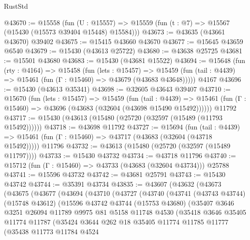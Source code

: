\begin{lexlean}{RustStd}
\begin{coremodule}
@43670 := @15558
    (fun (U : @15557) => @15559 (fun (t : @7) => @15567 (@15430 (@15573 @39404 @15448) @15584)))
@43673 := @43635 (@43661 @43670) @39402
@43675 := @15415 @43660 @43670
@43677 := @15645 @43659 @6540
@43679 := @15430 (@43613 @25722)
@43680 := @43638 @25725
@43681 := @15501 @43680
@43683 := @15430 (@43681 @15522)
@43694 := @15648
    (fun (rty : @4164) =>
    @15458
      (fun (lets : @15457) =>
      @15459 (fun (tail : @4439) => @15461 (fun (Γ : @15460) => @43679 (@43683 @43648)))))
    @4167
@43696 := @15430 (@43613 @35341)
@43698 := @32605 @43643 @39407
@43710 := @15670
    (fun (lets : @15457) =>
    @15459
      (fun (tail : @4439) =>
      @15461 (fun (Γ : @15460) => @43696 (@43683 (@32604 (@43698 @15490 @15492))))))
    @11792
@43717 := @15430 (@43613 (@15480 (@25720 (@32597 (@15489 (@11793 @15492))))))
@43718 := @43698 @11792
@43727 := @15694
    (fun (tail : @4439) => @15461 (fun (Γ : @15460) => @43717 (@43683 (@32604 (@43718 @15492)))))
    @11796
@43732 := @43613 (@15480 (@25720 (@32597 (@15489 @11797))))
@43733 := @15430 @43732
@43734 := @43718 @11796
@43740 := @15712 (fun (Γ : @15460) => @43733 (@43683 (@32604 @43734))) @25788
@43741 := @15596 @43732
@43742 := @43681 @25791
@43743 := @15430 @43742
@43744 := @35391 @43734
@43835 := @43607
    (@43632
      (@43673
        (@43675
          (@43677
            (@43694
              (@43710
                (@43727
                  (@43740
                    (@43741
                      (@43743 @43744)
                      (@15748 @43612)
                      (@15596
                        @43742
                        @43744
                        (@15753 @43680)
                        (@35407
                          @3646
                          @3251
                          @26094
                          @11789
                          @9975
                          @81
                          @5158
                          @11748
                          @4530
                          (@35418
                            @3646
                            @35405
                            @11774
                            @11787
                            (@35424
                              @3644
                              @262
                              @18
                              @35405
                              @11774
                              @11785
                              @11777
                              (@35438
                                @11773
                                @11784
                                @4524

\end{coremodule}
\end{lexlean}
